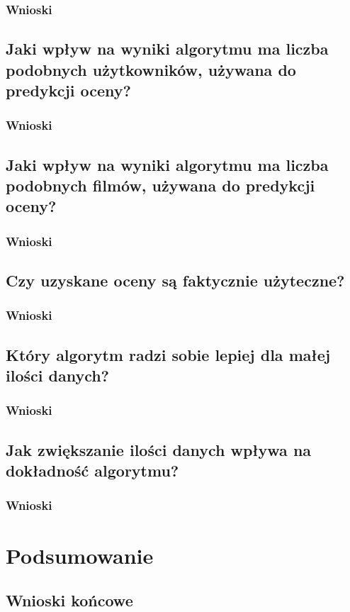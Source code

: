 \documentclass[12pt, a4paper]{article}
\begin{document}
\subsubsection{Wnioski}

\subsection{Jaki wpływ na wyniki algorytmu ma liczba podobnych użytkowników, używana do predykcji oceny?}

\subsubsection{Wnioski}

\subsection{Jaki wpływ na wyniki algorytmu ma liczba podobnych filmów, używana do predykcji oceny?}

\subsubsection{Wnioski}

\subsection{Czy uzyskane oceny są faktycznie użyteczne?}

\subsubsection{Wnioski}

\subsection{Który algorytm radzi sobie lepiej dla małej ilości danych?}

\subsubsection{Wnioski}

\subsection{Jak zwiększanie ilości danych wpływa na dokładność algorytmu?}

\subsubsection{Wnioski}

\section{Podsumowanie}

\subsection{Wnioski końcowe}

\nocite{*}


\end{document}
